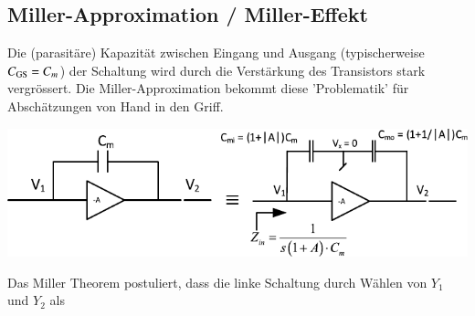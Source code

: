 






\subsection{Miller-Approximation / Miller-Effekt}

Die (parasitäre) Kapazität zwischen Eingang und Ausgang (typischerweise $C_{\rm GS} = C_m$) der Schaltung wird durch die Verstärkung des Transistors stark vergrössert.
Die Miller-Approximation bekommt diese 'Problematik' für Abschätzungen von Hand in den Griff.

\begin{center}
    \includegraphics[width=0.85\columnwidth]{images/08_Miller_C.pdf}
\end{center}


Das Miller Theorem postuliert, dass die linke Schaltung durch Wählen von $Y_1$ und $Y_2$ als 

\vspace{-0.2cm}

